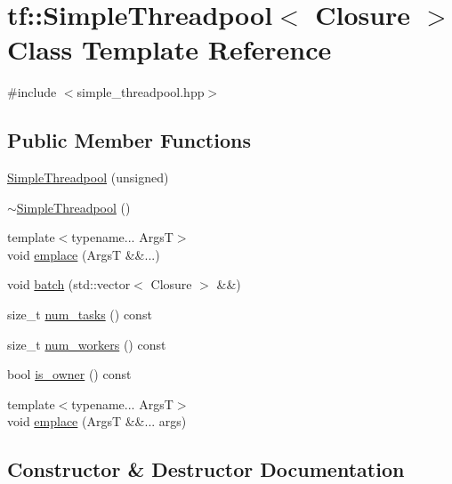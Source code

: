 \hypertarget{classtf_1_1SimpleThreadpool}{}\section{tf\+:\+:Simple\+Threadpool$<$ Closure $>$ Class Template Reference}
\label{classtf_1_1SimpleThreadpool}


{\ttfamily \#include $<$simple\+\_\+threadpool.\+hpp$>$}

\subsection*{Public Member Functions}
\begin{DoxyCompactItemize}
\item 
\hyperlink{classtf_1_1SimpleThreadpool_a15238417427ce5a8e80771f462e2f26e}{Simple\+Threadpool} (unsigned)
\item 
\hyperlink{classtf_1_1SimpleThreadpool_a673036c638ce061385c00a9f37c2151d}{$\sim$\+Simple\+Threadpool} ()
\item 
{\footnotesize template$<$typename... ArgsT$>$ }\\void \hyperlink{classtf_1_1SimpleThreadpool_ad64bf6fa31065d1f4ccfe22c20d29a51}{emplace} (ArgsT \&\&...)
\item 
void \hyperlink{classtf_1_1SimpleThreadpool_a30d6487677a85bdbe908d473ef9a9579}{batch} (std\+::vector$<$ Closure $>$ \&\&)
\item 
size\+\_\+t \hyperlink{classtf_1_1SimpleThreadpool_aed771a0ae0de0f30d143b122645acd46}{num\+\_\+tasks} () const
\item 
size\+\_\+t \hyperlink{classtf_1_1SimpleThreadpool_a4fec0216bb89a6ed2a9e59f2b1a4f01a}{num\+\_\+workers} () const
\item 
bool \hyperlink{classtf_1_1SimpleThreadpool_a7dedd805ca19fa696d5f6df42ae0fcf8}{is\+\_\+owner} () const
\item 
{\footnotesize template$<$typename... ArgsT$>$ }\\void \hyperlink{classtf_1_1SimpleThreadpool_abcd89eaa2c7bd7f4139587cb531229c2}{emplace} (ArgsT \&\&... args)
\end{DoxyCompactItemize}


\subsection{Constructor \& Destructor Documentation}
\mbox{\label{classtf_1_1SimpleThreadpool_a15238417427ce5a8e80771f462e2f26e}} 
